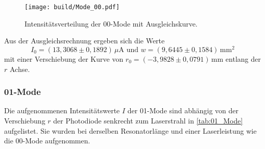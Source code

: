 \begin{figure}[h]
    \centering
    \texttt{[image: build/Mode\_00.pdf]}
    \caption{Intensitätsverteilung der 00-Mode mit Ausgleichskurve.}
    \label{fig:Mode_00}
\end{figure}
Aus der Ausgleichsrechnung ergeben sich die Werte 
\begin{equation*}
    I_0 = (13{,}3068 \pm 0{,}1892) \, \unit{\mu\ampere} \,\, \text{und} \,\, w = (9{,}6445 \pm 0{,}1584) \, \unit{\milli\meter\squared}
\end{equation*}
mit einer Verschiebung der Kurve von $r_0 = (-3{,}9828 \pm 0{,}0791)\, \unit{\milli\meter}$ entlang der $r$ Achse.
\FloatBarrier 

\subsubsection{01-Mode}
Die aufgenommenen Intensitätswerte $I$ der 01-Mode sind abhängig von der Verschiebung $r$ der Photodiode senkrecht zum Laserstrahl in \autoref{tab:01_Mode} aufgelistet. Sie wurden bei derselben Resonatorlänge und einer Laserleistung wie die 00-Mode aufgenommen.
